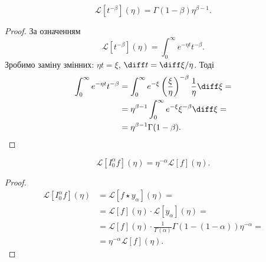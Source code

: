 \begin{lemma}
    \begin{equation}
        \mathscr{L}[t^{-\beta}](\eta) = \Gamma(1 - \beta) \eta^{\beta - 1}.
    \end{equation}
\end{lemma}
\begin{proof}
    За означенням
    \begin{equation}
        \mathscr{L}[t^{-\beta}](\eta) = \int_0^\infty e^{- \eta t} t^{-\beta}.
    \end{equation}
    Зробимо заміну змінних: $\eta t = \xi$, $\diff t = \diff \xi / \eta$. Тоді
    \begin{equation}
        \begin{aligned}
            \int_0^\infty e^{- \eta t} t^{-\beta} &= \int_0^\infty e^{-\xi} \left(\frac{\xi}{\eta}\right)^{-\beta} \frac{1}{\eta} \diff \xi = \\
            &= \eta^{\beta - 1} \int_0^\infty e^{-\xi} \xi^{-\beta} \diff \xi = \\
            &= \eta^{\beta - 1} \Gamma(1 - \beta).
        \end{aligned}
    \end{equation}
\end{proof}

\begin{lemma}
    \begin{equation}
        \mathscr{L}[I_0^\alpha f](\eta) = \eta^{-\alpha} \mathscr{L}[f](\eta).
    \end{equation}
\end{lemma}
\begin{proof}
    \begin{equation}
        \begin{aligned}
            \mathscr{L}[I_0^\alpha f](\eta) &= \mathscr{L}[f \star y_\alpha](\eta) = \\
            &= \mathscr{L}[f](\eta) \cdot \mathscr{L}[y_\alpha](\eta) = \\
            &= \mathscr{L}[f](\eta) \cdot \frac{1}{\Gamma(\alpha)} \Gamma(1 - (1 - \alpha)) \eta^{-\alpha} = \\
            &= \eta^{-\alpha} \mathscr{L}[f](\eta).
        \end{aligned}
    \end{equation}
\end{proof}

